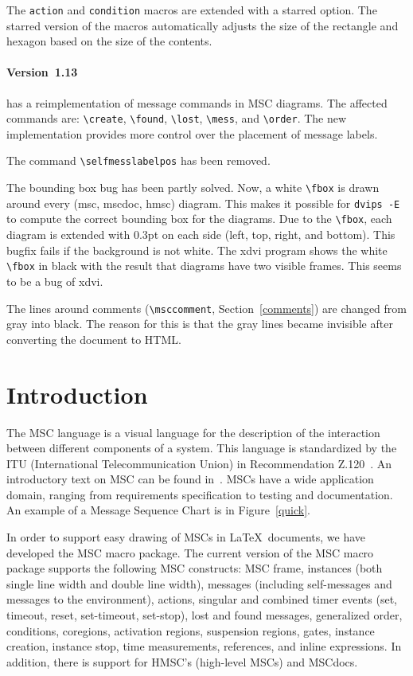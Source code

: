 \documentclass[12pt,a4paper]{article}
\newcommand{\acro}[1]{{#1}}
\newcommand{\MSC}{\acro{MSC}}
\newcommand{\HMSC}{\acro{HMSC}}
\newcommand{\MSCdoc}{\MSC{}doc}
\newcommand{\mscpack}{\MSC{} macro package}
\begin{document}
The \verb+action+ and \verb+condition+ macros are extended with a
starred option. The starred version of the macros automatically
adjusts the size of the rectangle and hexagon based on the size of the
contents. 

\paragraph{Version~1.13} has a reimplementation of message commands in MSC
diagrams. The affected commands are: \verb+\create+, \verb+\found+,
\verb+\lost+, \verb+\mess+, and \verb+\order+. The new implementation
provides more control over the placement of message labels.

The command \verb+\selfmesslabelpos+ has been removed.

The bounding box bug has been partly solved. Now, a white \verb+\fbox+
is drawn around every (msc, mscdoc, hmsc) diagram. This makes it
possible for \texttt{dvips -E} to compute the correct bounding box for
the diagrams. Due to the \verb+\fbox+, each diagram is extended with
0.3pt on each side (left, top, right, and bottom). This bugfix fails
if the background is not white. The xdvi program shows the white
\verb+\fbox+ in black with the result that diagrams have two visible
frames. This seems to be a bug of xdvi.

The lines around comments (\verb+\msccomment+, Section~\ref{comments})
are changed from gray into black. The reason for this is that the gray
lines became invisible after converting the document to HTML.

\section{Introduction}
\label{introduction}

The \MSC{} language is a visual language for the description of the
interaction between different components of a system.
This language is standardized by the ITU (International
Telecommunication Union) in Recommendation Z.120~\cite{z120}. An
introductory text on \MSC{} can be found
in~\cite{RudolphGrabowskiGraubmann96}. \MSC{}s have a
wide application domain, ranging from requirements specification to
testing and documentation.
An example of a Message Sequence Chart is in Figure~\ref{quick}.

In order to support easy drawing of \MSC{}s in \LaTeX\ documents, we have
developed the \mscpack.  The current version of the \mscpack{}
supports the following \MSC{} constructs: \MSC{} frame, instances (both
single line width and double line width), messages (including
self-messages and messages to the environment), actions, singular and
combined timer events (set, timeout, reset, set-timeout, set-stop),
lost and found messages, generalized order, conditions, coregions,
activation regions, suspension regions, gates, instance creation,
instance stop, time measurements, references, and inline
expressions. In addition, there is support for \HMSC{}'s (high-level
\MSC{}s) and \MSCdoc{}s.
\end{document}
